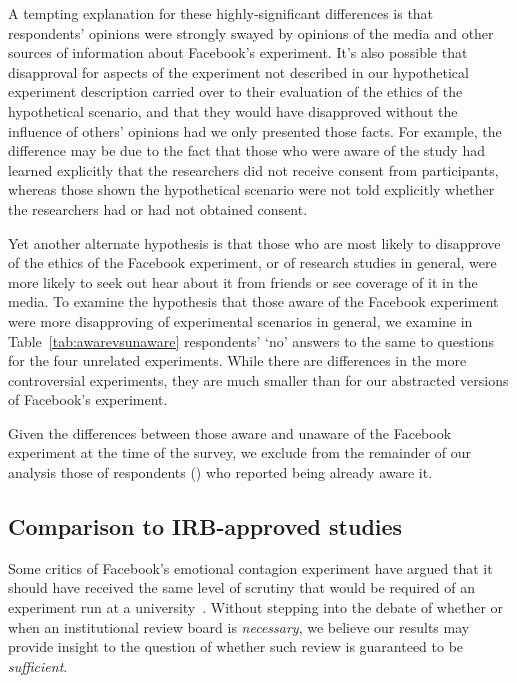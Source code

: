 A tempting explanation for these highly-significant differences is that respondents' opinions were strongly swayed by opinions of the media and other sources of information about Facebook's experiment.  It's also possible that disapproval for aspects of the experiment not described in our hypothetical experiment description carried over to their evaluation of the ethics of the hypothetical scenario, and that they would have disapproved without the influence of others' opinions had we only presented those facts.  For example, the difference may be due to the fact that those who were aware of the study had learned explicitly that the researchers did not receive consent from participants, whereas those shown the hypothetical scenario were not told explicitly whether the researchers had or had not obtained consent.

Yet another alternate hypothesis is that those who are most likely to disapprove of the ethics of the Facebook experiment, or of research studies in general, were more likely to seek out hear about it from friends or see coverage of it in the media. To examine the hypothesis that those aware of the Facebook experiment were more disapproving of experimental scenarios in general, we examine in Table~\ref{tab:awarevsunaware} respondents' `no' answers to the same to questions for the four unrelated experiments.  While there are differences in the more controversial experiments, they are much smaller than for our abstracted versions of Facebook's experiment.




Given the differences between those aware and unaware of the Facebook experiment at the time of the survey, we exclude from the remainder of our analysis those  of  respondents () who reported being already aware it.

\subsection{Comparison to IRB-approved studies}
Some critics of Facebook's emotional contagion experiment have argued that it should have received the same level of scrutiny that would be required of an experiment run at a university~\cite{WSJ:Criticism,CBC:Criticism,Ithaca:Criticism,WashingtonPost:Criticism}.
Without stepping into the debate of whether or when an institutional review board is \emph{necessary}, we believe our results may provide insight to the question of whether such review is guaranteed to be \emph{sufficient}.

